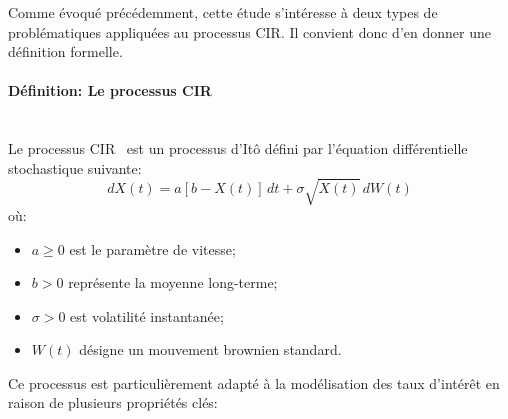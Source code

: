Comme évoqué précédemment, cette étude s'intéresse à deux types de problématiques appliquées au processus \acl{CIR}. Il convient donc d'en donner une définition formelle.

\paragraph{Définition: Le processus \acl{CIR}}\mbox{}\\
Le processus \ac{CIR}~\cite{cox1985} est un processus d'Itô défini par l'équation différentielle stochastique suivante:
\begin{equation}
    dX(t) = a[b - X(t)]\,dt + \sigma \sqrt{X(t)}\,dW(t)
\end{equation}\label{cir_eq}
où:
\begin{itemize}
    \item $a \geq 0$ est le paramètre de vitesse;
    \item $b > 0$ représente la moyenne long-terme;
    \item $\sigma > 0$ est volatilité instantanée;
    \item $W(t)$ désigne un mouvement brownien standard.
\end{itemize}

Ce processus est particulièrement adapté à la modélisation des taux d'intérêt en raison de plusieurs propriétés clés:

